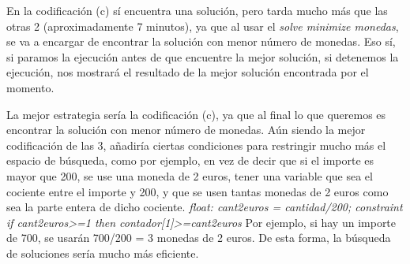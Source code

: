 \documentclass{article}
\begin{document}
\begin{description}
    En la codificación (c) sí encuentra una solución, pero tarda mucho más que las otras 2 (aproximadamente 7 minutos), ya que al usar el \emph{solve minimize monedas}, se va a encargar
    de encontrar la solución con menor número de monedas. Eso sí, si paramos la ejecución antes de que encuentre la mejor solución, si detenemos la ejecución,
    nos mostrará el resultado de la mejor solución encontrada por el momento.

  \item[\begin{tabular}{p{15cm}}{En caso afirmativo, ¿cuál podría ser una estrategia prometedora?}\end{tabular}]
    La mejor estrategia sería la codificación (c), ya que al final lo que queremos es encontrar la solución con menor número de monedas.
    Aún siendo la mejor codificación de las 3, añadiría ciertas condiciones para restringir mucho más el espacio de búsqueda, 
    como por ejemplo, en vez de decir que si el importe es mayor que 200, se use una moneda de 2 euros, tener una variable que sea el 
    cociente entre el importe y 200, y que se usen tantas monedas de 2 euros como sea la parte entera de dicho cociente.
    \emph{float: cant2euros = cantidad/200;
    constraint if cant2euros>=1 then contador[1]>=cant2euros}
    Por ejemplo, si hay un importe de 700, se usarán 700/200 = 3 monedas de 2 euros.
    De esta forma, la búsqueda de soluciones sería mucho más eficiente.

\end{description}



\newpage
\end{document}
